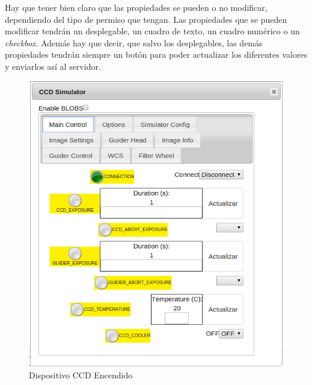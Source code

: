 Hay que tener bien claro que las propiedades se pueden o no modificar, dependiendo del tipo de permiso que tengan. Las propiedades que se pueden modificar tendrán un desplegable, un cuadro de texto, un cuadro numérico o un \textit{checkbox}. Además hay que decir, que salvo los desplegables, las demás propiedades tendrán siempre un botón para poder actualizar los diferentes valores y enviarlos así al servidor.
\begin{figure}[htb]
\centering
\includegraphics[width=1\textwidth]{./imagenes/capturaDispositivo}
\caption{Dispositivo CCD Encendido} \label{fig:capturaDispositivo}
\end{figure}


